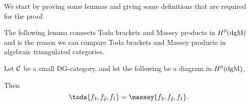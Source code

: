 We start by proving some lemmas and giving some definitions that are required for the proof.

The following lemma connects Toda brackets and Massey products in \( H^0(\operatorname{dgM}) \) and is the reason we can compare Toda brackets and Massey products in algebraic triangulated categories.

\begin{lemma}
    Let \( {\mathcal{C}} \) be a small DG-category, and let the following be a diagram in \( H^0(\operatorname{dgM}) \),
    \begin{center}
    \end{center}
    Then
    \[
        \toda{f_3, f_2, f_1} = \massey{f_3, f_2, f_1}.
    \]
\end{lemma}
